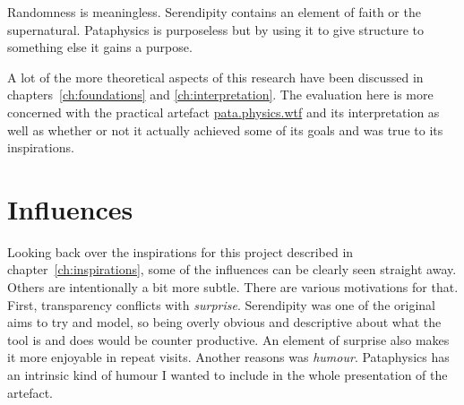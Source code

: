\begin{fcom}
Randomness is meaningless. Serendipity contains an element of faith or the supernatural. Pataphysics is purposeless but by using it to give structure to something else it gains a purpose.
\end{fcom}

\spirals

A lot of the more theoretical aspects of this research have been discussed in chapters~\ref{ch:foundations} and \ref{ch:interpretation}. The evaluation here is more concerned with the practical artefact \url{pata.physics.wtf} and its interpretation as well as whether or not it actually achieved some of its goals and was true to its inspirations.


\section{Influences}

Looking back over the inspirations for this project described in chapter~\ref{ch:inspirations}, some of the influences can be clearly seen straight away. Others are intentionally a bit more subtle. There are various motivations for that. First, transparency conflicts with \emph{surprise}. Serendipity was one of the original aims to try and model, so being overly obvious and descriptive about what the tool is and does would be counter productive. An element of surprise also makes it more enjoyable in repeat visits. Another reasons was \emph{humour}. Pataphysics has an intrinsic kind of humour I wanted to include in the whole presentation of the artefact. 

